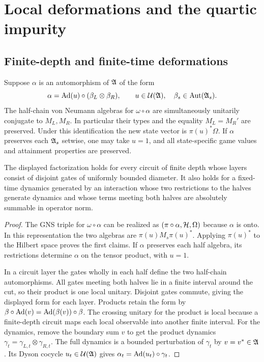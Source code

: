 \section{Local deformations and the quartic impurity}\label{app:interacting}
\subsection{Finite-depth and finite-time deformations}

\begin{proposition}\label{prop:factor}
Suppose $\alpha$ is an automorphism of $\mathfrak A$ of the form
\[
\alpha=\operatorname{Ad}(u)\circ(\beta_L\otimes\beta_R),\qquad
u\in\mathcal U(\mathfrak A),\quad\beta_s\in\operatorname{Aut}(\mathfrak A_s).
\]
The half-chain von Neumann algebras for $\omega\circ\alpha$ are simultaneously
unitarily conjugate to $M_L,M_R$. In particular their types and the equality
$M_L=M_R'$ are preserved. Under this identification the new state vector is
$\pi(u)^*\Omega$. If $\alpha$ preserves each $\mathfrak A_s$ setwise, one may take $u=1$,
and all state-specific game values and attainment properties are preserved.

The displayed factorization holds for every circuit of finite depth whose
layers consist of disjoint gates of uniformly bounded diameter. It also holds
for a fixed-time dynamics generated by an interaction whose two restrictions to
the halves generate dynamics and whose terms meeting both halves are absolutely
summable in operator norm.
\end{proposition}

\begin{proof}
The GNS triple for $\omega\circ\alpha$ can be realized as
$(\pi\circ\alpha,\mathcal H,\Omega)$ because $\alpha$ is onto. In this representation
the two algebras are $\pi(u)M_s\pi(u)^*$. Applying $\pi(u)^*$ to the Hilbert
space proves the first claims. If $\alpha$ preserves each half algebra, its
restrictions determine $\alpha$ on the tensor product, with $u=1$.

In a circuit layer the gates wholly in each half define the two half-chain
automorphisms. All gates meeting both halves lie in a finite interval around
the cut, so their product is one local unitary. Disjoint gates commute, giving
the displayed form for each layer. Products retain the form by
$\beta\circ\operatorname{Ad}(v)=\operatorname{Ad}(\beta(v))\circ\beta$. The crossing unitary for the product
is local because a finite-depth circuit maps each local observable into another
finite interval. For the dynamics, remove the boundary sum $v$ to get the
product dynamics $\gamma_t=\gamma_{L,t}\otimes\gamma_{R,t}$. The full dynamics is
a bounded perturbation of $\gamma_t$ by $v=v^*\in\mathfrak A$. Its Dyson cocycle
$u_t\in\mathcal U(\mathfrak A)$ gives $\alpha_t=\operatorname{Ad}(u_t)\circ\gamma_t$.
\end{proof}

